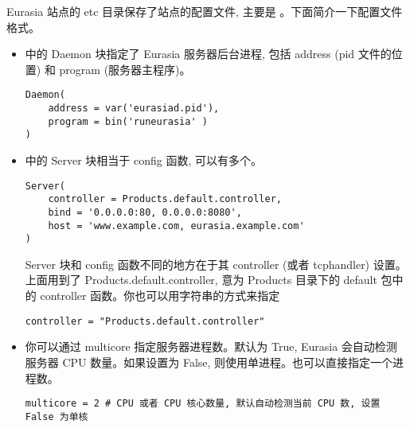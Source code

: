 \documentclass{manual}
\begin{document}
Eurasia 站点的 etc 目录保存了站点的配置文件, 主要是 。下面简介一下配置文件格式。

\begin{itemize}

\item {}

 中的 Daemon 块指定了 Eurasia 服务器后台进程, 包括 address (pid 文件的位置) 和 program (服务器主程序)。

\begin{verbatim}
Daemon(
	address = var('eurasiad.pid'),
	program = bin('runeurasia' )
)
\end{verbatim}


\item {}

 中的 Server 块相当于 config 函数, 可以有多个。

\begin{verbatim}
Server(
	controller = Products.default.controller,
	bind = '0.0.0.0:80, 0.0.0.0:8080',
	host = 'www.example.com, eurasia.example.com'
)
\end{verbatim}

Server 块和 config 函数不同的地方在于其 controller (或者 tcphandler) 设置。上面用到了 Products.default.controller, 意为 Products 目录下的 default 包中的 controller 函数。你也可以用字符串的方式来指定

\begin{verbatim}
controller = "Products.default.controller"
\end{verbatim}

\item {}

你可以通过 multicore 指定服务器进程数。默认为 True, Eurasia 会自动检测服务器 CPU 数量。如果设置为 False, 则使用单进程。也可以直接指定一个进程数。

\begin{verbatim}
multicore = 2 # CPU 或者 CPU 核心数量, 默认自动检测当前 CPU 数, 设置 False 为单核
\end{verbatim}



\end{itemize}
\end{document}
